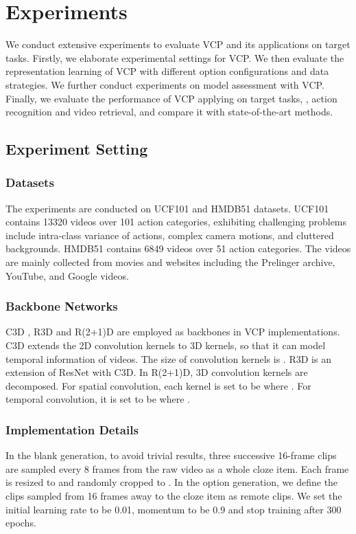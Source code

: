 \documentclass[letterpaper]{article}
\begin{document}
\section{Experiments}
We conduct extensive experiments to evaluate VCP and its applications on target tasks.
Firstly, we elaborate experimental settings for VCP. We then evaluate the representation learning of VCP with different option configurations and data strategies. We further conduct experiments on model assessment with VCP. Finally, we evaluate the performance of VCP applying on target tasks, , action recognition and video retrieval, and compare it with state-of-the-art methods.


\subsection{Experiment Setting}
\subsubsection{Datasets} 
The experiments are conducted on UCF101 \cite{soomro2012ucf101} and HMDB51 \cite{jhuang2011large} datasets. UCF101 contains 13320 videos over 101 action categories, exhibiting challenging problems include intra-class variance of actions, complex camera motions, and cluttered backgrounds. HMDB51 contains 6849 videos over 51 action categories. The videos are mainly collected from movies and websites including the Prelinger archive, YouTube, and Google videos.

\subsubsection{Backbone Networks} 
 C3D \cite{tran2015learning}, R3D and R(2+1)D \cite{tran2018closer} are employed as backbones in VCP implementations. C3D extends the 2D convolution kernels to 3D kernels, so that it can model temporal information of videos. The size of convolution kernels 
is . R3D is an extension of ResNet \cite{he2016deep} with C3D. In R(2+1)D, 3D convolution kernels are decomposed. For spatial convolution, each kernel is set to be  where . For temporal convolution, it is set to be  where .

\subsubsection{Implementation Details}
In the blank generation, to avoid trivial results, three successive 16-frame clips are sampled every 8 frames from the raw video as a whole cloze item. Each frame is resized to  and randomly cropped to . In the option generation, we define the clips sampled from 16 frames away to the cloze item as remote clips. We set the initial learning rate to be 0.01, momentum to be 0.9 and stop training after 300 epochs.
\end{document}
